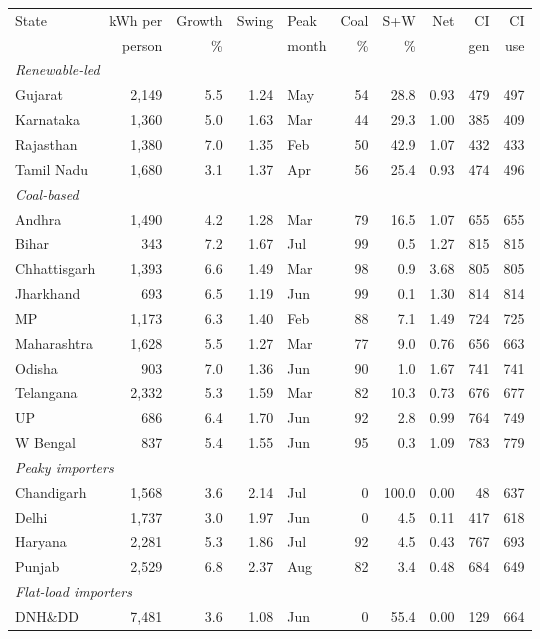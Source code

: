 \begin{tabular}{lrrrlrrrrr}
\toprule
State & kWh per & Growth & Swing & Peak & Coal & S+W & Net & CI & CI\\
 & person & \% & & month & \% & \% & & gen & use\\
\midrule
\multicolumn{10}{l}{\textit{Renewable-led}}\\
Gujarat & 2,149 & 5.5 & 1.24 & May & 54 & 28.8 & 0.93 & 479 & 497\\
Karnataka & 1,360 & 5.0 & 1.63 & Mar & 44 & 29.3 & 1.00 & 385 & 409\\
Rajasthan & 1,380 & 7.0 & 1.35 & Feb & 50 & 42.9 & 1.07 & 432 & 433\\
Tamil Nadu & 1,680 & 3.1 & 1.37 & Apr & 56 & 25.4 & 0.93 & 474 & 496\\
\multicolumn{10}{l}{\textit{Coal-based}}\\
Andhra & 1,490 & 4.2 & 1.28 & Mar & 79 & 16.5 & 1.07 & 655 & 655\\
Bihar & 343 & 7.2 & 1.67 & Jul & 99 & 0.5 & 1.27 & 815 & 815\\
Chhattisgarh & 1,393 & 6.6 & 1.49 & Mar & 98 & 0.9 & 3.68 & 805 & 805\\
Jharkhand & 693 & 6.5 & 1.19 & Jun & 99 & 0.1 & 1.30 & 814 & 814\\
MP & 1,173 & 6.3 & 1.40 & Feb & 88 & 7.1 & 1.49 & 724 & 725\\
Maharashtra & 1,628 & 5.5 & 1.27 & Mar & 77 & 9.0 & 0.76 & 656 & 663\\
Odisha & 903 & 7.0 & 1.36 & Jun & 90 & 1.0 & 1.67 & 741 & 741\\
Telangana & 2,332 & 5.3 & 1.59 & Mar & 82 & 10.3 & 0.73 & 676 & 677\\
UP & 686 & 6.4 & 1.70 & Jun & 92 & 2.8 & 0.99 & 764 & 749\\
W Bengal & 837 & 5.4 & 1.55 & Jun & 95 & 0.3 & 1.09 & 783 & 779\\
\multicolumn{10}{l}{\textit{Peaky importers}}\\
Chandigarh & 1,568 & 3.6 & 2.14 & Jul & 0 & 100.0 & 0.00 & 48 & 637\\
Delhi & 1,737 & 3.0 & 1.97 & Jun & 0 & 4.5 & 0.11 & 417 & 618\\
Haryana & 2,281 & 5.3 & 1.86 & Jul & 92 & 4.5 & 0.43 & 767 & 693\\
Punjab & 2,529 & 6.8 & 2.37 & Aug & 82 & 3.4 & 0.48 & 684 & 649\\
\multicolumn{10}{l}{\textit{Flat-load importers}}\\
DNH\&DD & 7,481 & 3.6 & 1.08 & Jun & 0 & 55.4 & 0.00 & 129 & 664\\

\end{tabular}
